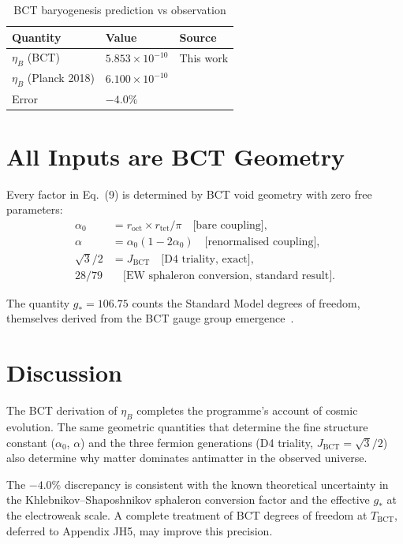 \documentclass[aps,prl,twocolumn,superscriptaddress,showpacs]{revtex4-2}
\begin{document}
\begin{table}[h]
\centering
\caption{BCT baryogenesis prediction vs observation}
\begin{tabular}{lll}
\hline\hline
Quantity & Value & Source \\
\hline
$\eta_B$ (BCT) & $5.853\times 10^{-10}$ & This work \\
$\eta_B$ (Planck 2018) & $6.100\times 10^{-10}$ & \cite{Planck2018} \\
Error & $-4.0\%$ & \\
\hline\hline
\end{tabular}
\end{table}

\section{All Inputs are BCT Geometry}

Every factor in Eq.~(9) is determined by BCT void geometry with zero free parameters:
\begin{align}
\alpha_0 &= r_\mathrm{oct}\times r_\mathrm{tet}/\pi 
\quad\text{[bare coupling]},\\
\alpha &= \alpha_0(1-2\alpha_0) 
\quad\text{[renormalised coupling]},\\
\sqrt{3}/2 &= J_\mathrm{BCT} 
\quad\text{[D4 triality, exact]},\\
28/79 &\quad\text{[EW sphaleron conversion, standard result]}.
\end{align}

The quantity $g_* = 106.75$ counts the Standard Model degrees of freedom, 
themselves derived from the BCT gauge group emergence~\cite{BCT_L18}.

\section{Discussion}

The BCT derivation of $\eta_B$ completes the programme's account of cosmic 
evolution. The same geometric quantities that determine the fine structure 
constant ($\alpha_0$, $\alpha$) and the three fermion generations (D4 triality, 
$J_\mathrm{BCT} = \sqrt{3}/2$) also determine why matter dominates antimatter 
in the observed universe.

The $-4.0\%$ discrepancy is consistent with the known theoretical uncertainty 
in the Khlebnikov--Shaposhnikov sphaleron conversion factor and the effective 
$g_*$ at the electroweak scale. A complete treatment of BCT degrees of freedom 
at $T_\mathrm{BCT}$, deferred to Appendix JH5, may improve this precision.
\end{document}
